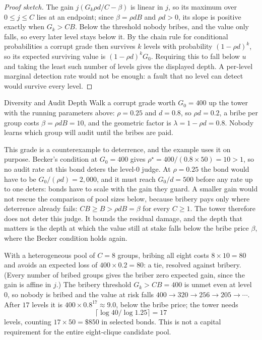 \documentclass[11pt,a4paper]{article}
\theoremstyle{definition}
\begin{document}
\begin{proof}[Proof sketch]
The gain $j(G_k\rho d/C-\beta)$ is linear in $j$, so its maximum over
$0\le j\le C$ lies at an endpoint; since $\beta=\rho dB$ and $\rho d>0$, its
slope is positive exactly when $G_k>CB$. Below the threshold nobody bribes, and
the value only falls, so every later level stays below it. By the chain rule for
conditional probabilities a corrupt grade then survives $k$ levels with
probability $(1-\rho d)^k$, so its expected surviving value is $(1-\rho
d)^kG_0$. Requiring this to fall below $u$ and taking the least such number of
levels gives the displayed depth. A per-level marginal detection rate would not
be enough: a fault that no level can detect would survive every level.
\end{proof}

\begin{pdexample}{Diversity and Audit Depth}
\setlength{\parskip}{4pt plus 1pt}
\label{ex:audit-depth}
Walk a corrupt grade worth $G_0 = 400$ up the tower with the running
parameters above: $\rho=0.25$ and $d=0.8$, so $\rho d = 0.2$, a bribe per
group costs $\beta = \rho d B = 10$, and the geometric factor is
$\lambda = 1-\rho d = 0.8$. Nobody learns which group will audit until the
bribes are paid.

This grade is a counterexample to deterrence, and the example uses it on
purpose. Becker's condition at $G_0=400$ gives $\rho^\star=400/(0.8\times50)=10>1$,
so no audit rate at this bond deters the level-0 judge. At $\rho=0.25$ the bond
would have to be $G_0/(\rho d)=2{,}000$, and it must reach $G_0/d=500$ before
any rate up to one deters: bonds have to scale with the gain they guard. A
smaller gain would not rescue the comparison of pool sizes below, because
bribery pays only where deterrence already fails: $CB\ge B>\rho dB=\beta$ for
every $C\ge1$. The tower
therefore does not deter this judge. It bounds the residual damage, and the
depth that matters is the depth at which the value still at stake falls below
the bribe price $\beta$, where the Becker condition holds again.

With a heterogeneous pool of $C=8$ groups, bribing all eight costs
$8\times10=80$ and avoids an expected loss of $400\times0.2=80$: a tie,
resolved against bribery. (Every number of bribed groups gives the briber
zero expected gain, since the gain is affine in $j$.) The bribery threshold
$G_k > CB = 400$ is unmet even at level 0, so nobody is bribed and the value
at risk falls $400\to320\to256\to205\to\cdots$. After $17$ levels it is
$400\times0.8^{17}\approx9.0$, below the bribe price; the tower needs
\[
  \lceil \log 40/\log 1.25 \rceil = 17
\]
levels, counting $17\times50=\$850$ in selected bonds. This is not a
capital requirement for the entire eight-clique candidate pool.


\end{pdexample}
\end{document}
